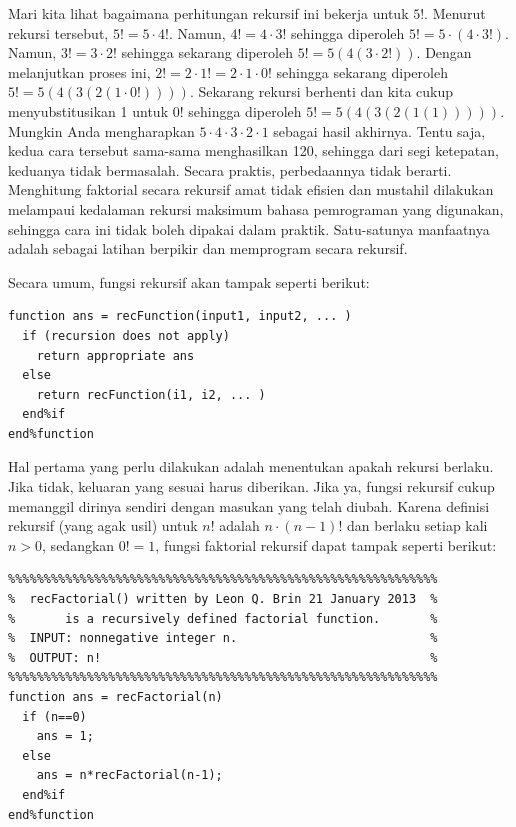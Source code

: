 Mari kita lihat bagaimana perhitungan rekursif ini bekerja untuk $5!$.
Menurut rekursi tersebut, $5!=5\cdot4!$. Namun, $4!=4\cdot3!$ sehingga
diperoleh $5!=5\cdot(4\cdot3!)$. Namun, $3!=3\cdot2!$ sehingga sekarang
diperoleh $5!=5(4(3\cdot2!))$. Dengan melanjutkan proses ini, $2!=2\cdot1!=2\cdot1\cdot0!$
sehingga sekarang diperoleh $5!=5(4(3(2(1\cdot0!))))$. Sekarang rekursi
berhenti dan kita cukup menyubstitusikan 1 untuk $0!$ sehingga diperoleh
$5!=5(4(3(2(1(1)))))$. Mungkin Anda mengharapkan $5\cdot4\cdot3\cdot2\cdot1$
sebagai hasil akhirnya. Tentu saja, kedua cara tersebut sama-sama
menghasilkan 120, sehingga dari segi ketepatan, keduanya tidak bermasalah.
Secara praktis, perbedaannya tidak berarti. Menghitung faktorial secara
rekursif amat tidak efisien dan mustahil dilakukan melampaui kedalaman
rekursi maksimum bahasa pemrograman yang digunakan, sehingga cara
ini tidak boleh dipakai dalam praktik. Satu-satunya manfaatnya adalah
sebagai latihan berpikir dan memprogram secara rekursif.

Secara umum, fungsi rekursif  akan
tampak seperti berikut:\begin{verbatim}
function ans = recFunction(input1, input2, ... )
  if (recursion does not apply)
    return appropriate ans
  else
    return recFunction(i1, i2, ... )
  end%if
end%function
\end{verbatim}Hal pertama yang perlu dilakukan adalah menentukan apakah rekursi
berlaku. Jika tidak, keluaran yang sesuai harus diberikan. Jika ya,
fungsi rekursif cukup memanggil dirinya sendiri dengan masukan yang
telah diubah. Karena definisi rekursif (yang agak usil) untuk $n!$
adalah $n\cdot(n-1)!$ dan berlaku setiap kali $n>0$, sedangkan $0!=1$,
fungsi faktorial rekursif dapat tampak seperti berikut:\begin{verbatim}
%%%%%%%%%%%%%%%%%%%%%%%%%%%%%%%%%%%%%%%%%%%%%%%%%%%%%%%%%%%%
%  recFactorial() written by Leon Q. Brin 21 January 2013  %
%       is a recursively defined factorial function.       %
%  INPUT: nonnegative integer n.                           %
%  OUTPUT: n!                                              %
%%%%%%%%%%%%%%%%%%%%%%%%%%%%%%%%%%%%%%%%%%%%%%%%%%%%%%%%%%%%
function ans = recFactorial(n)
  if (n==0)
    ans = 1;
  else
    ans = n*recFactorial(n-1);
  end%if
end%function
\end{verbatim}

